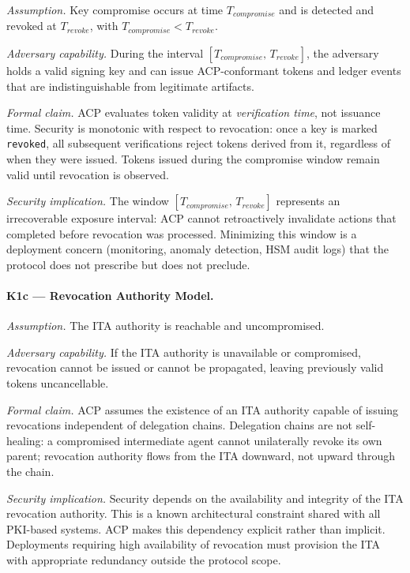 \documentclass[11pt]{article}
\theoremstyle{definition}
\begin{document}
\textit{Assumption.}
Key compromise occurs at time $T_{\mathit{compromise}}$ and is detected and revoked at
$T_{\mathit{revoke}}$, with $T_{\mathit{compromise}} < T_{\mathit{revoke}}$.

\textit{Adversary capability.}
During the interval $[T_{\mathit{compromise}},\, T_{\mathit{revoke}}]$,
the adversary holds a valid signing key and can issue ACP-conformant tokens and ledger events
that are indistinguishable from legitimate artifacts.

\textit{Formal claim.}
ACP evaluates token validity at \emph{verification time}, not issuance time.
Security is monotonic with respect to revocation:
once a key is marked \texttt{revoked}, all subsequent verifications reject tokens derived from it,
regardless of when they were issued.
Tokens issued during the compromise window remain valid until revocation is observed.

\textit{Security implication.}
The window $[T_{\mathit{compromise}},\, T_{\mathit{revoke}}]$ represents an irrecoverable
exposure interval: ACP cannot retroactively invalidate actions that completed before revocation
was processed.
Minimizing this window is a deployment concern (monitoring, anomaly detection, HSM audit logs)
that the protocol does not prescribe but does not preclude.

\paragraph{K1c --- Revocation Authority Model.}

\textit{Assumption.}
The ITA authority is reachable and uncompromised.

\textit{Adversary capability.}
If the ITA authority is unavailable or compromised, revocation cannot be issued
or cannot be propagated, leaving previously valid tokens uncancellable.

\textit{Formal claim.}
ACP assumes the existence of an ITA authority capable of issuing revocations
independent of delegation chains.
Delegation chains are not self-healing:
a compromised intermediate agent cannot unilaterally revoke its own parent;
revocation authority flows from the ITA downward, not upward through the chain.

\textit{Security implication.}
Security depends on the availability and integrity of the ITA revocation authority.
This is a known architectural constraint shared with all PKI-based systems.
ACP makes this dependency explicit rather than implicit.
Deployments requiring high availability of revocation must provision the ITA
with appropriate redundancy outside the protocol scope.
\end{document}
